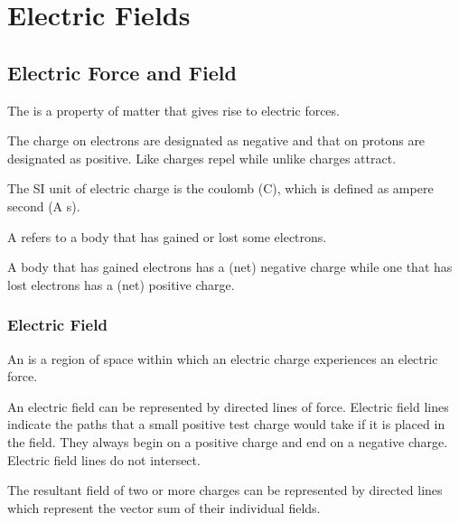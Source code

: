\chapter{Electric Fields}

\section{Electric Force and Field}

\begin{definition}
    The  is a property of matter that gives rise to electric forces.
\end{definition}

The charge on electrons are designated as negative and that on protons are designated as positive. Like charges repel while unlike charges attract.

The SI unit of electric charge is the coulomb (C), which is defined as ampere second (A s).

\begin{definition}
    A  refers to a body that has gained or lost some electrons.
\end{definition}

A body that has gained electrons has a (net) negative charge while one that has lost electrons has a (net) positive charge.

\subsection{Electric Field}

\begin{definition}
    An  is a region of space within which an electric charge experiences an electric force.
\end{definition}

An electric field can be represented by directed lines of force. Electric field lines indicate the paths that a small positive test charge would take if it is placed in the field. They always begin on a positive charge and end on a negative charge. Electric field lines do not intersect.

The resultant field of two or more charges can be represented by directed lines which represent the vector sum of their individual fields.

